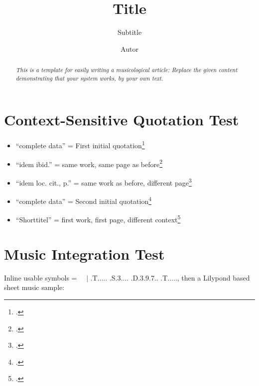 \documentclass[
  DIV=calc,
  BCOR=5mm,
  11pt,
  headings=small,
  oneside,
  abstract=true,
  toc=bib,
  ngerman,english]{scrartcl}
\begin{document}
\nocite{*}

\titlehead{Classification}
\subject{Release }
\title{Title}
\subtitle{Subtitle}
\author{Autor}

\maketitle
\begin{abstract}
\noindent \itshape
This is a template for easily writing a musicological article: Replace the given content demonstrating that your system works, by your own text.
\end{abstract}


\footnotesize
\tableofcontents
\normalsize

\section{Context-Sensitive Quotation Test}
\begin{itemize}
  \item \enquote{complete data} = First initial quotation\footcite[vgl.][123]{Grabner1974a}
  \item \enquote{idem ibid.} = same work, same page as before\footcite[cf.][123]{Grabner1974a}
  \item \enquote{idem loc. cit., p.} = same work as before, different page\footcite[cf.][125f]{Grabner1974a}
  \item \enquote{complete data} = Second initial quotation\footcite[vgl.][123]{Delamotte2011a}
  \item \enquote{Shorttitel} = first work, first page, different context\footcite[cf.][123]{Grabner1974a}
\end{itemize}

\section{Music Integration Test}

Inline usable symbols =  \SePa \Vier\SechBL\SechBL\ \Halb\Pu\ $|$ \HH.T..... \HH.S.3.... \HH.D.3.9.7.. \HH.T....., then a Lilypond based sheet music sample:



\begin{center}
\end{center}



\printnomenclature
\printbibliography
\end{document}
